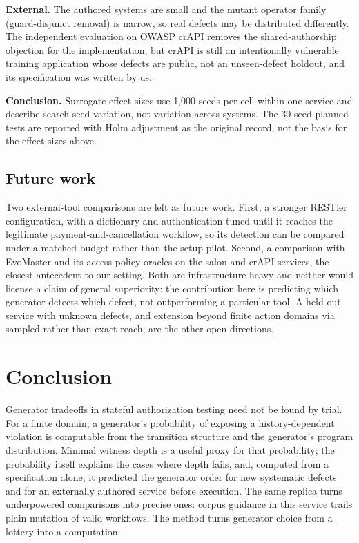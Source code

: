 \documentclass[conference]{IEEEtran}
\begin{document}
\textbf{External.} The authored systems are small and the mutant operator family
(guard-disjunct removal) is narrow, so real defects may be distributed differently. The
independent evaluation on OWASP crAPI removes the shared-authorship objection for the
implementation, but crAPI is still an intentionally vulnerable training application whose
defects are public, not an unseen-defect holdout, and its specification was written by us.

\textbf{Conclusion.} Surrogate effect sizes use 1{,}000 seeds per cell within one service
and describe search-seed variation, not variation across systems. The 30-seed planned
tests are reported with Holm adjustment as the original record, not the basis for the
effect sizes above.

\subsection{Future work}
Two external-tool comparisons are left as future work. First, a stronger RESTler
configuration, with a dictionary and authentication tuned until it reaches the legitimate
payment-and-cancellation workflow, so its detection can be compared under a matched budget
rather than the setup pilot. Second, a comparison with EvoMaster and its access-policy
oracles \cite{r19,r27} on the salon and crAPI services, the closest antecedent to our
setting. Both are infrastructure-heavy and neither would license a claim of general
superiority: the contribution here is predicting which generator detects which defect, not
outperforming a particular tool. A held-out service with unknown defects, and extension
beyond finite action domains via sampled rather than exact reach, are the other open
directions.

\section{Conclusion}
Generator tradeoffs in stateful authorization testing need not be found by trial. For a
finite domain, a generator's probability of exposing a history-dependent violation is
computable from the transition structure and the generator's program distribution. Minimal
witness depth is a useful proxy for that probability; the probability itself explains the
cases where depth fails, and, computed from a specification alone, it predicted the
generator order for new systematic defects and for an externally authored service before
execution. The same replica turns underpowered comparisons into precise ones: corpus
guidance in this service trails plain mutation of valid workflows. The method turns
generator choice from a lottery into a computation.
\end{document}
